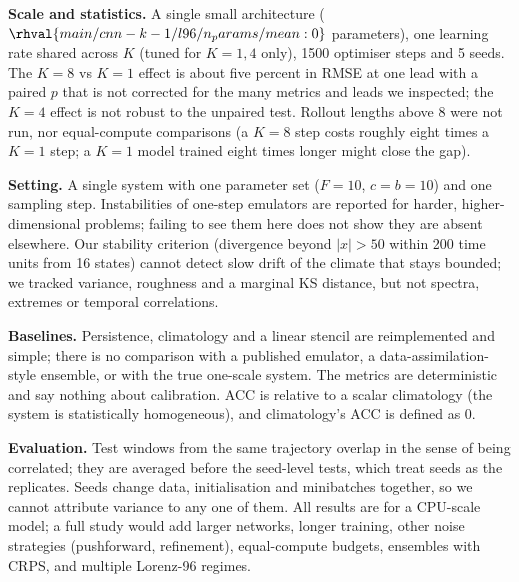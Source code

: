 \textbf{Scale and statistics.} A single small architecture ($\rhval{main/cnn-k-1/l96/n_params/mean:0}$ parameters), one learning rate shared across $K$ (tuned for $K=1,4$ only), 1500 optimiser steps and 5 seeds. The $K{=}8$ vs $K{=}1$ effect is about five percent in RMSE at one lead with a paired $p$ that is not corrected for the many metrics and leads we inspected; the $K{=}4$ effect is not robust to the unpaired test. Rollout lengths above $8$ were not run, nor equal-compute comparisons (a $K{=}8$ step costs roughly eight times a $K{=}1$ step; a $K{=}1$ model trained eight times longer might close the gap).

\textbf{Setting.} A single system with one parameter set ($F{=}10$, $c{=}b{=}10$) and one sampling step. Instabilities of one-step emulators are reported for harder, higher-dimensional problems; failing to see them here does not show they are absent elsewhere. Our stability criterion (divergence beyond $|x|>50$ within 200 time units from 16 states) cannot detect slow drift of the climate that stays bounded; we tracked variance, roughness and a marginal KS distance, but not spectra, extremes or temporal correlations.

\textbf{Baselines.} Persistence, climatology and a linear stencil are reimplemented and simple; there is no comparison with a published emulator, a data-assimilation-style ensemble, or with the true one-scale system. The metrics are deterministic and say nothing about calibration. ACC is relative to a scalar climatology (the system is statistically homogeneous), and climatology's ACC is defined as $0$.

\textbf{Evaluation.} Test windows from the same trajectory overlap in the sense of being correlated; they are averaged before the seed-level tests, which treat seeds as the replicates. Seeds change data, initialisation and minibatches together, so we cannot attribute variance to any one of them. All results are for a CPU-scale model; a full study would add larger networks, longer training, other noise strategies (pushforward, refinement), equal-compute budgets, ensembles with CRPS, and multiple Lorenz-96 regimes.
